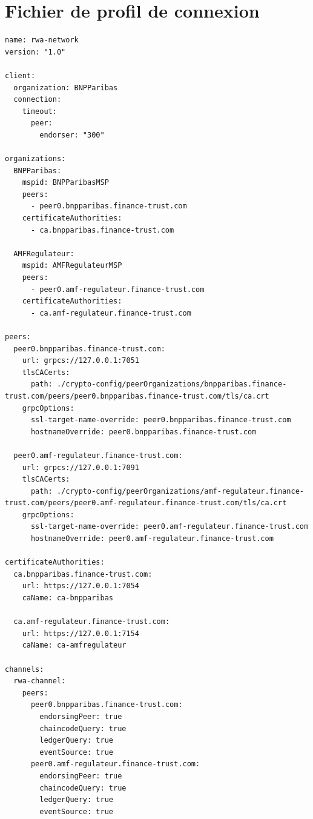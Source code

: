 \documentclass[12pt,a4paper,french]{article}
\begin{document}
\section{Fichier de profil de connexion}

\begin{lstlisting}[style=yaml, caption={network/config/connection\_profile.yaml}]
name: rwa-network
version: "1.0"

client:
  organization: BNPParibas
  connection:
    timeout:
      peer:
        endorser: "300"

organizations:
  BNPParibas:
    mspid: BNPParibasMSP
    peers:
      - peer0.bnpparibas.finance-trust.com
    certificateAuthorities:
      - ca.bnpparibas.finance-trust.com

  AMFRegulateur:
    mspid: AMFRegulateurMSP
    peers:
      - peer0.amf-regulateur.finance-trust.com
    certificateAuthorities:
      - ca.amf-regulateur.finance-trust.com

peers:
  peer0.bnpparibas.finance-trust.com:
    url: grpcs://127.0.0.1:7051
    tlsCACerts:
      path: ./crypto-config/peerOrganizations/bnpparibas.finance-trust.com/peers/peer0.bnpparibas.finance-trust.com/tls/ca.crt
    grpcOptions:
      ssl-target-name-override: peer0.bnpparibas.finance-trust.com
      hostnameOverride: peer0.bnpparibas.finance-trust.com

  peer0.amf-regulateur.finance-trust.com:
    url: grpcs://127.0.0.1:7091
    tlsCACerts:
      path: ./crypto-config/peerOrganizations/amf-regulateur.finance-trust.com/peers/peer0.amf-regulateur.finance-trust.com/tls/ca.crt
    grpcOptions:
      ssl-target-name-override: peer0.amf-regulateur.finance-trust.com
      hostnameOverride: peer0.amf-regulateur.finance-trust.com

certificateAuthorities:
  ca.bnpparibas.finance-trust.com:
    url: https://127.0.0.1:7054
    caName: ca-bnpparibas

  ca.amf-regulateur.finance-trust.com:
    url: https://127.0.0.1:7154
    caName: ca-amfregulateur

channels:
  rwa-channel:
    peers:
      peer0.bnpparibas.finance-trust.com:
        endorsingPeer: true
        chaincodeQuery: true
        ledgerQuery: true
        eventSource: true
      peer0.amf-regulateur.finance-trust.com:
        endorsingPeer: true
        chaincodeQuery: true
        ledgerQuery: true
        eventSource: true
\end{lstlisting}
\end{document}
